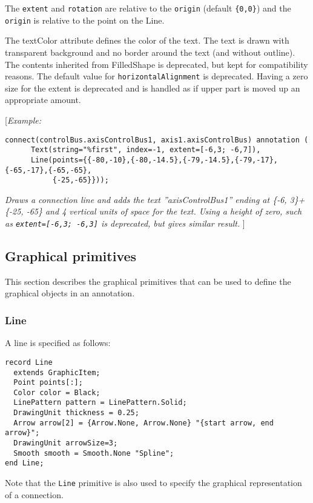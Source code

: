 The \lstinline!extent! and \lstinline!rotation! are relative to the \lstinline!origin! (default \lstinline!{0,0}!)
and the \lstinline!origin! is relative to the point on the Line.

The textColor attribute defines the color of the text. The text is drawn
with transparent background and no border around the text (and without
outline). The contents inherited from FilledShape is deprecated, but kept for compatibility reasons.
The default value for \lstinline!horizontalAlignment! is deprecated.
Having a zero size for the extent is deprecated and is handled as if upper part is moved up an appropriate amount.

{[}\emph{Example:}
\begin{lstlisting}[language=modelica]
  connect(controlBus.axisControlBus1, axis1.axisControlBus) annotation (
      Text(string="%first", index=-1, extent=[-6,3; -6,7]),
      Line(points={{-80,-10},{-80,-14.5},{-79,-14.5},{-79,-17},{-65,-17},{-65,-65},
           {-25,-65}}));
\end{lstlisting}
\emph{Draws a connection line and adds the text ''axisControlBus1''
ending at \{-6, 3\}+\{-25, -65\} and 4 vertical units of space for the text.
Using a height of zero, such as \lstinline!extent=[-6,3; -6,3]! is deprecated, but gives similar result.}
{]}

\subsection{Graphical primitives}

This section describes the graphical primitives that can be used to
define the graphical objects in an annotation.

\subsubsection{Line}

A line is specified as follows:

\begin{lstlisting}[language=modelica]
record Line
  extends GraphicItem;
  Point points[:];
  Color color = Black;
  LinePattern pattern = LinePattern.Solid;
  DrawingUnit thickness = 0.25;
  Arrow arrow[2] = {Arrow.None, Arrow.None} "{start arrow, end arrow}";
  DrawingUnit arrowSize=3;
  Smooth smooth = Smooth.None "Spline";
end Line;
\end{lstlisting}
Note that the \lstinline!Line! primitive is also used to specify the graphical
representation of a connection.


